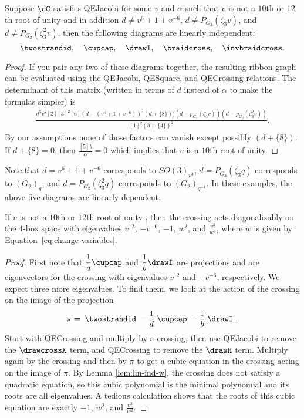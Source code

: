 \documentclass[12pt]{amsart}
\begin{document}
\begin{lemma} \label{lem:lin-ind-w}
Suppose $\cC$ satisfies QEJacobi for some $v$ and $\alpha$ such that $v$ is
not a $10$th or $12$th root of unity and in addition $d \neq v^6+1+v^{-6}$, $d
\neq P_{G_2}(\zeta_3 v)$, and $d \neq P_{G_2}(\zeta_3^2 v)$, then the
following diagrams are linearly independent:
$$\twostrandid,\quad \cupcap,\quad \drawI,\quad\braidcross,\quad\invbraidcross.$$
\end{lemma}
\begin{proof}
If you pair any two of these diagrams together, the resulting ribbon graph can
be evaluated using the QEJacobi, QESquare, and QECrossing relations.  The
determinant of this matrix (written in terms of $d$ instead of $\alpha$ to
make the formulas simpler) is
\begin{align*}
\frac
{
d^5 v^8 [2][3]^2[6] (d-(v^{6}+1+v^{-6}))^2 (d + \{8\})) (d-p_{G_2}(\zeta_3 v)) (d-p_{G_2}(\zeta_3^2 v))
}
{
[1]^{2}(d + \{4\})^{2}
}.
\end{align*}
By our assumptions none of those factors can vanish except possibly
$(d+\{8\})$.  If $d+\{8\} = 0$, then $\frac{[5]b}{\alpha} = 0$ which implies
that $v$ is a $10$th root of unity.
\end{proof}

\begin{remark}
Note that $d = v^6+1+v^{-6}$ corresponds to $SO(3)_{v^3}$, $d=P_{G_2}(\zeta_3 q)$ 
corresponds to $(G_2)_{q}$, and $d=P_{G_2}(\zeta_3^2 q)$ corresponds to
$(G_2)_{q^{-1}}$.  In these examples, the above five diagrams are linearly
dependent.  
\end{remark}


\begin{lemma}\label{lem:eigenvalues-twist}
If $v$ is not a $10$th or $12$th root of unity , then the crossing acts
diagonalizably on the $4$-box space with eigenvalues $v^{12}$, $-v^{-6}$,
$-1$, $w^2$, and $\frac{v^2}{w^2}$, where $w$ is given by
Equation~\eqref{eq:change-variables}.
\end{lemma}
\begin{proof}
First note that $\displaystyle\frac{1}{d} \cupcap$ and $\displaystyle\frac{1}{b} \drawI$ are projections
and are eigenvectors for the crossing with eigenvalues $v^{12}$ and
$-v^{-6}$, respectively. We expect three more eigenvalues.
To find them, we look at the action of the crossing
on the image of the projection
$$\pi = \;\twostrandid\; -\frac{1}{d}\;\cupcap\; -\frac{1}{b}\;\drawI\;.$$
Start with QECrossing and multiply by a crossing, then use QEJacobi to remove
the $\drawcrossX$ term, and QECrossing to remove the $\drawH$ term.  Multiply
again by the crossing and then by $\pi$ to get a cubic equation in the
crossing acting on the image of $\pi$.  By Lemma \ref{lem:lin-ind-w}, the
crossing does not satisfy a quadratic equation, so this cubic polynomial is
the minimal polynomial and its roots are all eigenvalues.  A tedious
calculation shows that the roots of this cubic equation are exactly $-1$,
$w^2$, and $\frac{v^2}{w^2}$.
\end{proof}
\end{document}
